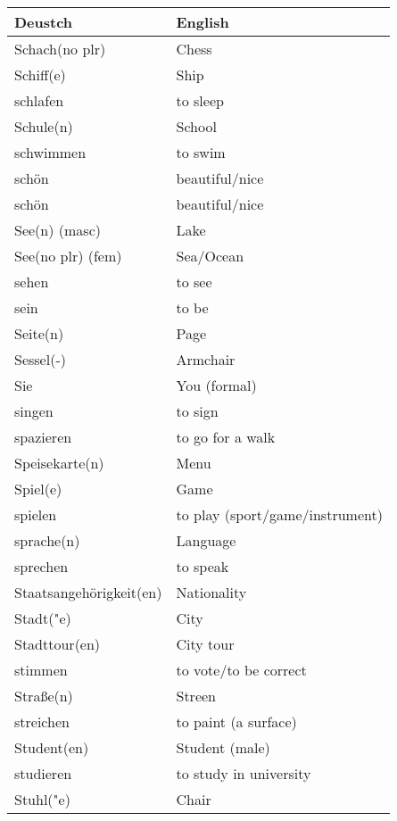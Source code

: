 \documentclass{article}
\renewcommand{\arraystretch}{1}
\begin{document}
\newpage

\begin{minipage}{0.48\textwidth}
    \centering
    \renewcommand{\arraystretch}{1.5}
    \begin{tabular}{|>{\raggedright\arraybackslash}p{3.5cm}|>{\raggedright\arraybackslash}p{3.5cm}|}
        \hline
        \rowcolor{gray!20} \textbf{Deustch} & \textbf{English} \\
        \hline
        Schach(no plr) & Chess \\\hline
        Schiff(e) & Ship \\\hline
        schlafen & to sleep \\\hline
        Schule(n) & School \\\hline
        schwimmen & to swim \\\hline
        schön & beautiful/nice \\\hline
        schön & beautiful/nice \\\hline
        See(n) (masc) & Lake \\\hline
        See(no plr) (fem) & Sea/Ocean \\\hline
        sehen & to see \\\hline
        sein & to be \\\hline
        Seite(n) & Page \\\hline
        Sessel(-) & Armchair \\\hline
        Sie & You (formal) \\\hline
        singen & to sign \\\hline
        spazieren & to go for a walk \\\hline
        Speisekarte(n) & Menu \\\hline
        Spiel(e) & Game \\\hline
        spielen & to play (sport/game/instrument) \\\hline
        sprache(n) & Language \\\hline
        sprechen & to speak \\\hline
        Staatsangehörigkeit(en) & Nationality \\\hline
        Stadt("e) & City \\\hline
        Stadttour(en) & City tour \\\hline
        stimmen & to vote/to be correct \\\hline
        Stra\ss{}e(n) & Streen \\\hline
        streichen & to paint (a surface) \\\hline
        Student(en) & Student (male) \\\hline
        studieren & to study in university \\\hline
        Stuhl("e) & Chair \\\hline
    \end{tabular}
\end{minipage}%
\end{document}
